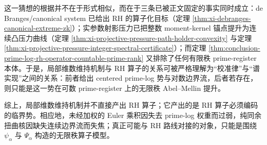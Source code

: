 这一猜想的根据并不在于形式相似，而在于三条已被正文固定的事实同时成立：de Branges/canonical system 已给出 RH 的算子化目标（定理 \ref{thm:xi-debranges-canonical-extreme-zk}）；实参数射影压力已把整数 moment-kernel 锚点提升为连续凸压力曲线（定理 \ref{thm:xi-projective-pressure-path-holder-convexity} 与定理 \ref{thm:xi-projective-pressure-integer-spectral-certificate}）；而定理 \ref{thm:conclusion-prime-log-rh-operator-countable-prime-rank} 又排除了任何有限秩 prime-register 本体。于是，局部维数维持机制与 RH 算子的关系可被严格理解为“校准律”与“谱实现”之间的关系：前者给出 centered prime-log 势与对数边界流，后者若存在，则只能是这一势在可数 prime-register 上的无限秩 Abel--Mellin 提升。

综上，局部维数维持机制并不直接产出 RH 算子；它产出的是 RH 算子必须编码的临界势。相应地，未经加权的 Euler 乘积因失去 prime-log 权重而过弱，纯同余扭曲核因缺失连续边界流而失焦；真正可能与 RH 路线对接的对象，只能是围绕 \(\psi_\alpha\) 与 \(\Psi_\alpha\) 构造的无限秩算子模型。
